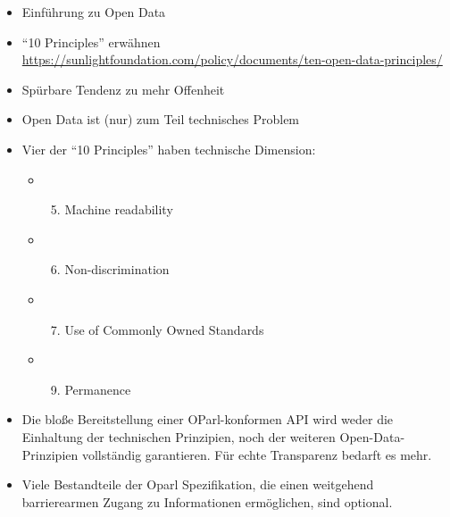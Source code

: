 \documentclass[,a4paper]{article}
\begin{document}
\begin{itemize}
\item
  Einführung zu Open Data
\item
  ``10 Principles'' erwähnen
  \url{https://sunlightfoundation.com/policy/documents/ten-open-data-principles/}
\item
  Spürbare Tendenz zu mehr Offenheit
\item
  Open Data ist (nur) zum Teil technisches Problem
\item
  Vier der ``10 Principles'' haben technische Dimension:

  \begin{itemize}
  \item
    \begin{enumerate}[1.]
    \setcounter{enumi}{4}
    \item
      Machine readability
    \end{enumerate}
  \item
    \begin{enumerate}[1.]
    \setcounter{enumi}{5}
    \item
      Non-discrimination
    \end{enumerate}
  \item
    \begin{enumerate}[1.]
    \setcounter{enumi}{6}
    \item
      Use of Commonly Owned Standards
    \end{enumerate}
  \item
    \begin{enumerate}[1.]
    \setcounter{enumi}{8}
    \item
      Permanence
    \end{enumerate}
  \end{itemize}
\item
  Die bloße Bereitstellung einer OParl-konformen API wird weder die
  Einhaltung der technischen Prinzipien, noch der weiteren
  Open-Data-Prinzipien vollständig garantieren. Für echte Transparenz
  bedarft es mehr.
\item
  Viele Bestandteile der Oparl Spezifikation, die einen weitgehend
  barrierearmen Zugang zu Informationen ermöglichen, sind optional.


\end{itemize}
\end{document}
